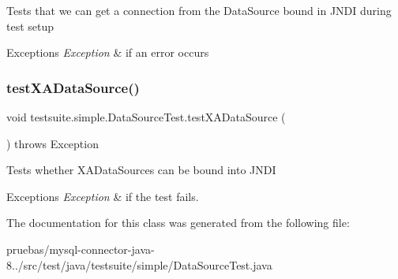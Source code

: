 Tests that we can get a connection from the Data\+Source bound in J\+N\+DI during test setup


\begin{DoxyExceptions}{Exceptions}
{\em Exception} & if an error occurs \\
\hline
\end{DoxyExceptions}
\mbox{\label{classtestsuite_1_1simple_1_1_data_source_test_aeffb3e326e27d83bfc0da82269ef479b}} 
\subsubsection{\texorpdfstring{test\+X\+A\+Data\+Source()}{testXADataSource()}}
{\footnotesize\ttfamily void testsuite.\+simple.\+Data\+Source\+Test.\+test\+X\+A\+Data\+Source (\begin{DoxyParamCaption}{ }\end{DoxyParamCaption}) throws Exception}

Tests whether X\+A\+Data\+Sources can be bound into J\+N\+DI


\begin{DoxyExceptions}{Exceptions}
{\em Exception} & if the test fails. \\
\hline
\end{DoxyExceptions}


The documentation for this class was generated from the following file\+:\begin{DoxyCompactItemize}
\item 
pruebas/mysql-\/connector-\/java-\/8../src/test/java/testsuite/simple/Data\+Source\+Test.\+java\end{DoxyCompactItemize}
